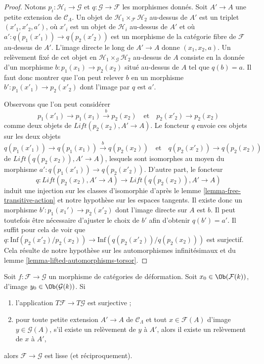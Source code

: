 \begin{proof}
Notons $p_i : \mathcal{H}_i \to \mathcal{G}$ et
$q : \mathcal{G} \to \mathcal{F}$ les morphismes donnés. Soit $A' \to A$ une
petite extension de $\mathcal{C}_\Lambda$. Un objet de
$\mathcal{H}_1 \times_\mathcal{F} \mathcal{H}_2$ au-dessus de $A'$ est un
triplet $(x'_1, x'_2, a')$, où $x'_i$ est un objet de $\mathcal{H}_i$
au-dessus de $A'$ et où $a' : q(p_1(x'_1)) \to q(p_2(x'_2))$ est un morphisme
de la catégorie fibre de $\mathcal{F}$ au-dessus de $A'$. L'image directe le
long de $A' \to A$ donne $(x_1, x_2, a)$. Un relèvement fixé de cet objet en
$\mathcal{H}_1 \times_\mathcal{G} \mathcal{H}_2$ au-dessus de $A$
consiste en la donnée d'un morphisme $b : p_1(x_1) \to p_2(x_2)$ situé au-dessus de $A$ tel que
$q(b) = a$. Il faut donc montrer que l'on peut relever $b$ en un morphisme
$b' : p_1(x'_1) \to p_2(x'_2)$ dont l'image par $q$ est $a'$.

\medskip\noindent
Observons que l'on peut considérer
$$
p_1(x'_1) \to p_1(x_1) \xrightarrow{b} p_2(x_2)
\quad\text{et}\quad
p_2(x'_2) \to p_2(x_2)
$$
comme deux objets de $\textit{Lift}(p_2(x_2), A' \to A)$. Le foncteur $q$
envoie ces objets sur les deux objets
$$
q(p_1(x'_1)) \to q(p_1(x_1)) \xrightarrow{b} q(p_2(x_2))
\quad\text{et}\quad
q(p_2(x'_2)) \to q(p_2(x_2))
$$
de $\textit{Lift}(q(p_2(x_2)), A' \to A)$, lesquels sont isomorphes au moyen
du morphisme $a' : q(p_1(x'_1)) \to q(p_2(x'_2))$. D'autre part, le foncteur
$$
q : \textit{Lift}(p_2(x_2), A' \to A) \to
\textit{Lift}(q(p_2(x_2)), A' \to A)
$$
induit une injection sur les classes d'isomorphie d'après le lemme
\ref{lemma-free-transitive-action} et notre hypothèse sur les espaces tangents.
Il existe donc un morphisme $b' : p_1(x_1') \to p_2(x'_2)$ dont l'image
directe sur $A$ est $b$. Il peut toutefois être nécessaire d'ajuster le choix
de $b'$ afin d'obtenir $q(b') = a'$. Il suffit pour cela de voir que
$q : \text{Inf}(p_2(x'_2)/p_2(x_2)) \to \text{Inf}(q(p_2(x'_2))/q(p_2(x_2)))$
est surjectif. Cela résulte de notre hypothèse sur les automorphismes
infinitésimaux et du lemme \ref{lemma-lifted-automorphisms-torsor}.
\end{proof}

\begin{lemma}
\label{lemma-easy-check-smooth}
Soit $f : \mathcal{F} \to \mathcal{G}$ un morphisme de catégories de
déformation. Soit $x_0 \in \Ob(\mathcal{F}(k))$, d'image
$y_0 \in \Ob(\mathcal{G}(k))$. Si
\begin{enumerate}
\item l'application $T\mathcal{F} \to T\mathcal{G}$ est surjective ;
\item pour toute petite extension $A' \to A$ de $\mathcal{C}_\Lambda$ et tout
$x \in \mathcal{F}(A)$ d'image $y \in \mathcal{G}(A)$, s'il existe un
relèvement de $y$ à $A'$, alors il existe un relèvement de $x$ à $A'$,
\end{enumerate}
alors $\mathcal{F} \to \mathcal{G}$ est lisse (et réciproquement).
\end{lemma}

